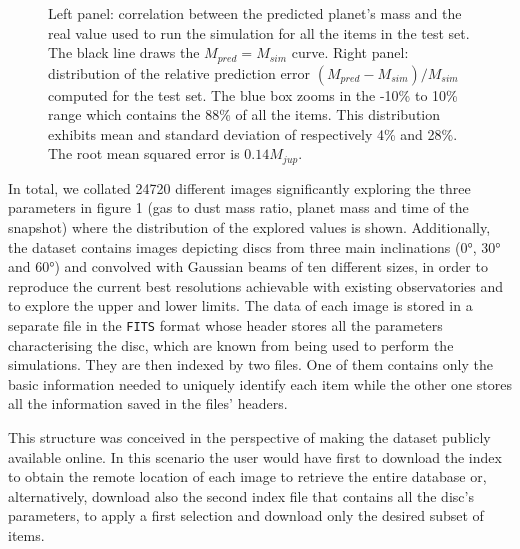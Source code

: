 \documentclass[a4paper,10pt, margin=1cm]{article}
\begin{document}
\begin{figure}
  \begin{center}
    \scalebox{0.85}{}
  \end{center}

  \caption{Left panel: correlation between the predicted planet's mass and the real value used to run the simulation
    for all the items in the test set. The black line draws the $M_{pred} = M_{sim}$ curve.
    Right panel: distribution of the relative prediction error $(M_{pred} - M_{sim})/M_{sim}$ 
        computed for the test set. The blue box 
    zooms in the -10\% to 10\% range which contains the 88\% of all the items. This distribution exhibits mean and standard 
    deviation of respectively 4\% and 28\%. The root mean squared error is $0.14 M_{jup}$.}

\end{figure}

In total, we collated 24720 different images significantly exploring the three parameters in figure 1 (gas to dust mass ratio, planet mass and
time of the snapshot) where the distribution of the explored values is shown. Additionally, the dataset contains images depicting discs from three main inclinations (0°, 30° and 60°) and convolved 
with Gaussian beams of ten different sizes, in order to reproduce the current best resolutions achievable with existing observatories
and to explore the upper and lower limits.
The data of each image is stored in a separate file in the \lstinline{FITS} format whose header stores all the parameters
characterising the disc, which are known from being used to perform the simulations.
They are then indexed by two files. One of them contains only the basic information
needed to uniquely identify each item while the other one stores all the information saved in the files' headers.

This structure was conceived in the perspective of making the dataset publicly available online.
In this scenario the user would have first to download the index to obtain the remote location
of each image to retrieve the entire database or, alternatively, download also the second index file
that contains all the disc's parameters, to apply a first selection and download only the desired subset of items.
\end{document}
